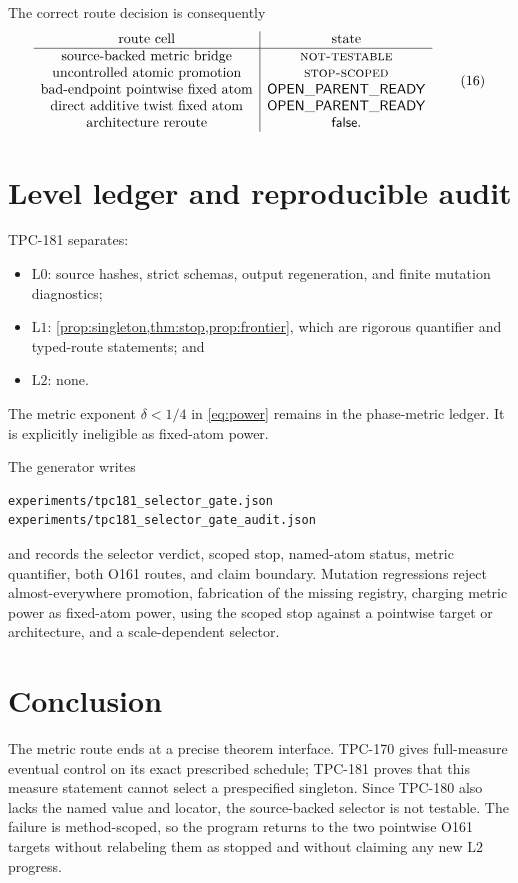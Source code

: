 \documentclass[11pt]{article}
\theoremstyle{definition}
\theoremstyle{remark}
\newcommand{\NT}{\textnormal{\textsc{not-testable}}}
\newcommand{\STOPR}{\textnormal{\textsc{stop-scoped}}}
\newcommand{\Lzero}{\mathrm{L0}}
\newcommand{\Lone}{\mathrm{L1}}
\newcommand{\Ltwo}{\mathrm{L2}}
\begin{document}
The correct route decision is consequently
\[
\begin{array}{c|c}
\text{route cell}&\text{state}\\
\hline
\text{source-backed metric bridge}&\NT\\
\text{uncontrolled atomic promotion}&\STOPR\\
\text{bad-endpoint pointwise fixed atom}&
  \mathsf{OPEN\_PARENT\_READY}\\
\text{direct additive twist fixed atom}&
  \mathsf{OPEN\_PARENT\_READY}\\
\text{architecture reroute}&\mathsf{false}.
\end{array}
\tag{16}\label{eq:route-table}
\]

\section{Level ledger and reproducible audit}

TPC-181 separates:
\begin{itemize}[leftmargin=2em]
\item \(\Lzero\): source hashes, strict schemas, output regeneration,
  and finite mutation diagnostics;
\item \(\Lone\): \cref{prop:singleton,thm:stop,prop:frontier}, which
  are rigorous quantifier and typed-route statements; and
\item \(\Ltwo\): none.
\end{itemize}
The metric exponent \(\delta<1/4\) in \eqref{eq:power} remains in the
phase-metric ledger.  It is explicitly ineligible as fixed-atom power.

The generator writes
\begin{verbatim}
experiments/tpc181_selector_gate.json
experiments/tpc181_selector_gate_audit.json
\end{verbatim}
and records the selector verdict, scoped stop, named-atom status,
metric quantifier, both O161 routes, and claim boundary.  Mutation
regressions reject almost-everywhere promotion, fabrication of the
missing registry, charging metric power as fixed-atom power, using the
scoped stop against a pointwise target or architecture, and a
scale-dependent selector.

\section{Conclusion}

The metric route ends at a precise theorem interface.  TPC-170 gives
full-measure eventual control on its exact prescribed schedule;
TPC-181 proves that this measure statement cannot select a
prespecified singleton.  Since TPC-180 also lacks the named value and
locator, the source-backed selector is not testable.  The failure is
method-scoped, so the program returns to the two pointwise O161
targets without relabeling them as stopped and without claiming any
new \(\Ltwo\) progress.

\nocite{*}


\end{document}
